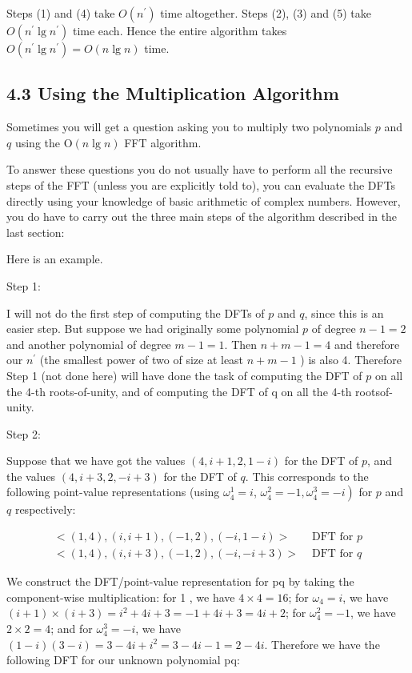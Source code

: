 Steps (1) and (4) take $O\left(n^{\prime}\right)$ time altogether. Steps (2), (3) and (5) take $O\left(n^{\prime} \lg n^{\prime}\right)$ time each. Hence the entire algorithm takes $O\left(n^{\prime} \lg n^{\prime}\right)=O(n \lg n)$ time.

\subsection*{4.3 Using the Multiplication Algorithm}
Sometimes you will get a question asking you to multiply two polynomials $p$ and $q$ using the $\mathrm{O}(n \lg n)$ FFT algorithm.

To answer these questions you do not usually have to perform all the recursive steps of the FFT (unless you are explicitly told to), you can evaluate the DFTs directly using your knowledge of basic arithmetic of complex numbers. However, you do have to carry out the three main steps of the algorithm described in the last section:

Here is an example.

Step 1:

I will not do the first step of computing the DFTs of $p$ and $q$, since this is an easier step. But suppose we had originally some polynomial $p$ of degree $n-1=2$ and another polynomial of degree $m-1=1$. Then $n+m-1=4$ and therefore our $n^{\prime}$ (the smallest power of two of size at least $n+m-1$ ) is also 4. Therefore Step 1 (not done here) will have done the task of computing the DFT of $p$ on all the 4-th roots-of-unity, and of computing the DFT of q on all the 4-th rootsof-unity.

Step 2:

Suppose that we have got the values $(4, i+1,2,1-i)$ for the DFT of $p$, and the values $(4, i+3,2,-i+3)$ for the DFT of $q$. This corresponds to the following point-value representations (using $\omega_{4}^{1}=i$, $\left.\omega_{4}^{2}=-1, \omega_{4}^{3}=-i\right)$ for $p$ and $q$ respectively:

$$
\begin{aligned}
<(1,4),(i, i+1),(-1,2),(-i, 1-i)> & \text { DFT for } p \\
<(1,4),(i, i+3),(-1,2),(-i,-i+3)> & \text { DFT for } q
\end{aligned}
$$

We construct the DFT/point-value representation for pq by taking the component-wise multiplication: for 1 , we have $4 \times 4=16$; for $\omega_{4}=i$, we have $(i+1) \times(i+3)=i^{2}+4 i+3=-1+4 i+3=4 i+2$; for $\omega_{4}^{2}=-1$, we have $2 \times 2=4$; and for $\omega_{4}^{3}=-i$, we have $(1-i)(3-i)=3-4 i+i^{2}=3-4 i-1=2-4 i$. Therefore we have the following DFT for our unknown polynomial pq:

